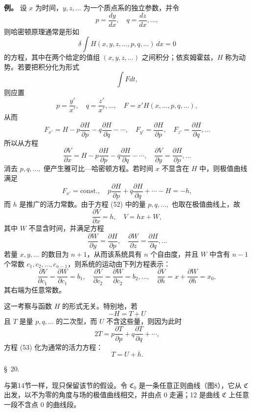 \documentclass[11pt,a4paper,leqno]{article}
\begin{document}
\bigskip

\noindent\textbf{例。} 设 $x$ 为时间，$y,z,\ldots$ 为一个质点系的独立参数，并令
\[
p=\frac{dy}{dx},\quad q=\frac{dz}{dx},\ldots,
\]
则哈密顿原理通常是形如
\[
\delta\int H(x,y,z,\ldots,p,q,\ldots)\,dx=0
\]
的方程，其中在两个给定的值组 $(x,y,z,\ldots)$ 之间积分；依亥姆霍兹，$H$ 称为动势。若要把积分化为形式
\[
\int Fdt,
\]
则应置
\[
p=\frac{y'}{x'},\quad q=\frac{z'}{x'},\ldots,\quad
F=x'H(x,\ldots,p,q,\ldots),
\]
从而
\[
F_{x'}=H-p\frac{\partial H}{\partial p}-q\frac{\partial H}{\partial q}-\cdots,\quad
F_{y'}=\frac{\partial H}{\partial p},\quad
F_{z'}=\frac{\partial H}{\partial q},\ldots
\]
所以从方程
\begin{equation}\tag{52}
\frac{\partial V}{\partial x}
=
H-p\frac{\partial H}{\partial p}
-q\frac{\partial H}{\partial q}-\cdots,\quad
\frac{\partial V}{\partial y}
=
\frac{\partial H}{\partial p},\ldots
\end{equation}
消去 $p,q,\ldots,$ 便产生雅可比—哈密顿方程。若时间 $x$ 不显含在 $H$ 中，则极值曲线满足
\begin{equation}\tag{53}
F_{x'}=\text{const.},\quad
p\frac{\partial H}{\partial p}
+
q\frac{\partial H}{\partial q}
+\cdots-H=-h,
\end{equation}
而 $h$ 是推广的活力常数。由于方程 (52) 中的量 $p,q,\ldots,$ 也取在极值曲线上，故
\[
\frac{\partial V}{\partial x}=h,\quad V=hx+W,
\]
其中 $W$ 不显含时间，并满足方程
\[
\frac{\partial W}{\partial y}
=
\frac{\partial H}{\partial p},\quad
\frac{\partial W}{\partial z}
=
\frac{\partial H}{\partial q},\ldots
\]
若量 $x,y,\ldots$ 的数目为 $n+1$，从而该系统具有 $n$ 个自由度，并且 $W$ 中含有 $n-1$ 个常数 $c_1,c_2,\ldots,c_{n-1}$，则系统的运动由下列方程表示：
\[
\frac{\partial V}{\partial c_1}=\frac{\partial W}{\partial c_1}=b_1,\quad
\frac{\partial V}{\partial c_2}=\frac{\partial W}{\partial c_2}=b_2,\ldots,\quad
\frac{\partial V}{\partial h}=x+\frac{\partial W}{\partial h}=x_0,
\]
其右端为任意常数。

这一考察与函数 $H$ 的形式无关。特别地，若
\[
-H=T+U
\]
且 $T$ 是量 $p,q,\ldots$ 的二次型，而 $U$ 不含这些量，则因为此时
\[
2T=p\frac{\partial T}{\partial p}+q\frac{\partial T}{\partial q}+\cdots,
\]
方程 (53) 化为通常的活力方程：
\[
T=U+h.
\]

\begin{center}{\large \S~20.}\end{center}

与第14节一样，现只保留该节的假设。令 $\mathfrak{C}_0$ 是一条任意正则曲线（图8），它从 $\mathfrak{C}$ 出发，以不为零的角度与场的极值曲线相交，并由点 0 走遍；12 是曲线 $\mathfrak{C}$ 上任意一段不含点 0 的曲线段。
\end{document}
